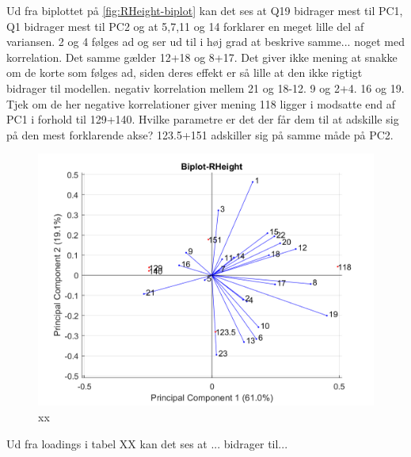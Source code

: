 Ud fra biplottet på \autoref{fig:RHeight-biplot} kan det ses at Q19 bidrager mest til PC1, Q1 bidrager mest til PC2 og at 5,7,11 og 14 forklarer en meget lille del af variansen. 2 og 4 følges ad og ser ud til i høj grad at beskrive samme... noget med korrelation. Det samme gælder 12+18 og 8+17. Det giver ikke mening at snakke om de korte som følges ad, siden deres effekt er så lille at den ikke rigtigt bidrager til modellen. 
negativ korrelation mellem 21 og 18-12. 9 og 2+4. 16 og 19. Tjek om de her negative korrelationer giver mening
118 ligger i modsatte end af PC1 i forhold til 129+140. Hvilke parametre er det der får dem til at adskille sig på den mest forklarende akse? 123.5+151 adskiller sig på samme måde på PC2.
\begin{figure}[H]
\centering
\includegraphics[width=\textwidth]{Figure/DatabehandlingSkalaer/PCAfigures/RHeight-Biplot.png}
\caption{xx}
\label{fig:RHeight-Biplot}
\end{figure}
 Ud fra loadings i tabel XX kan det ses at ... bidrager til...
